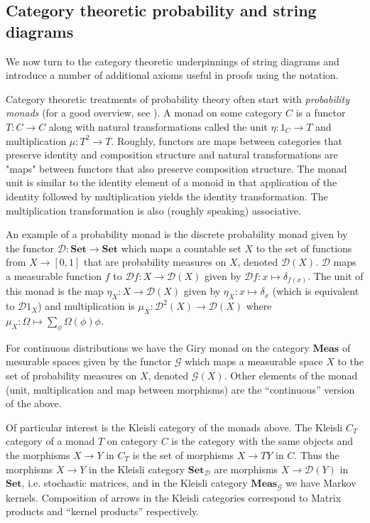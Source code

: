 
\subsection{Category theoretic probability and string diagrams}

We now turn to the category theoretic underpinnings of string diagrams and introduce a number of additional axioms useful in proofs using the notation.

Category theoretic treatments of probability theory often start with \emph{probability monads} (for a good overview, see \citep{jacobs_probability_2018}). A monad on some category $C$ is a functor $T:C\to C$ along with natural transformations called the unit $\eta:1_C\to T$ and multiplication $\mu:T^2\to T$. Roughly, functors are maps between categories that preserve identity and composition structure and natural transformations are "maps" between functors that also preserve composition structure. The monad unit is similar to the identity element of a monoid in that application of the identity followed by multiplication yields the identity transformation. The multiplication transformation is also (roughly speaking) associative.

An example of a probability monad is the discrete probability monad given by the functor $\mathcal{D}:\textbf{Set}\to\textbf{Set}$ which maps a countable set $X$ to the set of functions from $X\to [0,1]$ that are probability measures on $X$, denoted $\mathcal{D}(X)$. $\mathcal{D}$ maps a measurable function $f$ to $\mathcal{D}f:X\to \mathcal{D}(X)$ given by $\mathcal{D}f:x\mapsto \delta_{f(x)}$. The unit of this monad is the map $\eta_X:X\to \mathcal{D}(X)$ given by $\eta_X:x\mapsto \delta_x$ (which is equivalent to $\mathcal{D} 1_X$) and multiplication is $\mu_X:\mathcal{D}^2(X)\to \mathcal{D}(X)$ where $\mu_X:\Omega\mapsto \sum_{\phi} \Omega(\phi) \phi$.

For continuous distributions we have the Giry monad on the category $\textbf{Meas}$ of mesurable spaces given by the functor $\mathcal{G}$ which maps a measurable space $X$ to the set of probability measures on $X$, denoted $\mathcal{G}(X)$. Other elements of the monad (unit, multiplication and map between morphisms) are the ``continuous'' version of the above.

Of particular interest is the Kleisli category of the monads above. The Kleisli $C_T$ category of a monad $T$ on category $C$ is the category with the same objects and the morphisms $X\to Y$ in $C_T$ is the set of morphisms $X\to TY$ in $C$. Thus the morphisms $X\to Y$ in the Kleisli category $\textbf{Set}_{\mathcal{D}}$ are morphisms $X\to \mathcal{D}(Y)$ in $\textbf{Set}$, i.e. stochastic matrices, and in the Kleisli category $\textbf{Meas}_{\mathcal{G}}$ we have Markov kernels. Composition of arrows in the Kleisli categories correspond to Matrix products and ``kernel products'' respectively.


